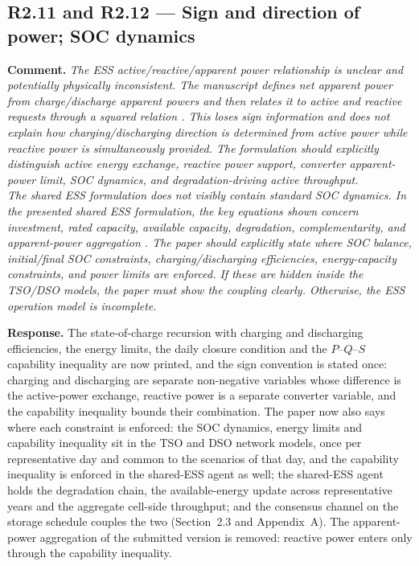 \documentclass[11pt]{article}
\newcommand{\rcomment}[1]{\par\medskip\noindent\textbf{Comment.} \textit{#1}\par\smallskip}
\newcommand{\rresponse}[1]{\noindent\textbf{Response.} #1\par\smallskip}
\begin{document}
\subsection*{R2.11 and R2.12 --- Sign and direction of power; SOC dynamics}
\rcomment{
    The ESS active/reactive/apparent power relationship is unclear and potentially physically inconsistent. The manuscript defines net apparent power from charge/discharge apparent powers and then relates it to active and reactive requests through a squared relation . This loses sign information and does not explain how charging/discharging direction is determined from active power while reactive power is simultaneously provided. The formulation should explicitly distinguish active energy exchange, reactive power support, converter apparent-power limit, SOC dynamics, and degradation-driving active throughput.\\
    The shared ESS formulation does not visibly contain standard SOC dynamics. In the presented shared ESS formulation, the key equations shown concern investment, rated capacity, available capacity, degradation, complementarity, and apparent-power aggregation . The paper should explicitly state where SOC balance, initial/final SOC constraints, charging/discharging efficiencies, energy-capacity constraints, and power limits are enforced. If these are hidden inside the TSO/DSO models, the paper must show the coupling clearly. Otherwise, the ESS operation model is incomplete.
}
\rresponse{
    The state-of-charge recursion with charging and discharging efficiencies, the energy limits, the daily closure condition and the $P$--$Q$--$S$ capability inequality are now printed, and the sign convention is stated once: charging and discharging are separate non-negative variables whose difference is the active-power exchange, reactive power is a separate converter variable, and the capability inequality bounds their combination. 
    The paper now also says where each constraint is enforced: the SOC dynamics, energy limits and capability inequality sit in the TSO and DSO network models, once per representative day and common to the scenarios of that day, and the capability inequality is enforced in the shared-ESS agent as well;
    the shared-ESS agent holds the degradation chain, the available-energy update across representative years and the aggregate cell-side throughput; and the consensus channel on the storage schedule couples the two (Section~2.3 and Appendix~A).
    The apparent-power aggregation of the submitted version is removed: reactive power enters only through the capability inequality.
}
\end{document}
